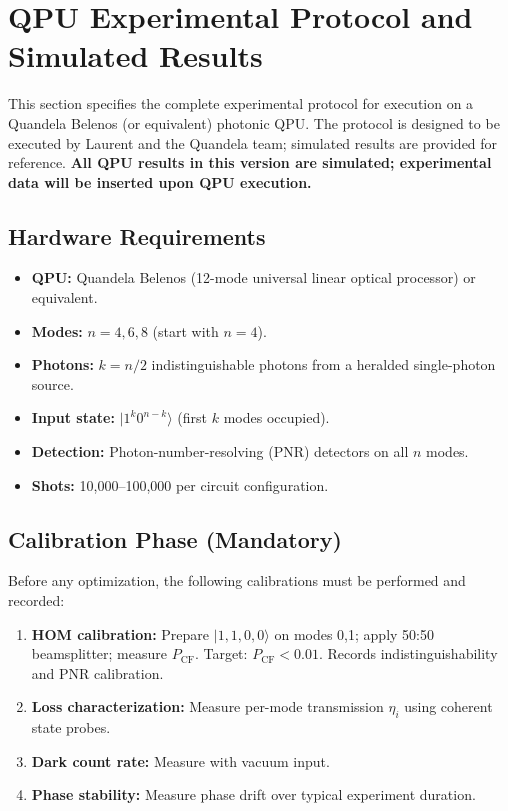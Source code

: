 \section{QPU Experimental Protocol and Simulated Results}
\label{sec:qpu}

This section specifies the complete experimental protocol for execution on a Quandela Belenos (or equivalent) photonic QPU. The protocol is designed to be executed by Laurent and the Quandela team; simulated results are provided for reference. \textbf{All QPU results in this version are simulated; experimental data will be inserted upon QPU execution.}

\subsection{Hardware Requirements}

\begin{itemize}
\item \textbf{QPU:} Quandela Belenos (12-mode universal linear optical processor) or equivalent.
\item \textbf{Modes:} $n=4,6,8$ (start with $n=4$).
\item \textbf{Photons:} $k=n/2$ indistinguishable photons from a heralded single-photon source.
\item \textbf{Input state:} $|1^k 0^{n-k}\rangle$ (first $k$ modes occupied).
\item \textbf{Detection:} Photon-number-resolving (PNR) detectors on all $n$ modes.
\item \textbf{Shots:} 10,000--100,000 per circuit configuration.
\end{itemize}

\subsection{Calibration Phase (Mandatory)}

Before any optimization, the following calibrations must be performed and recorded:

\begin{enumerate}
\item \textbf{HOM calibration:} Prepare $|1,1,0,0\rangle$ on modes 0,1; apply 50:50 beamsplitter; measure $P_{\mathrm{CF}}$. Target: $P_{\mathrm{CF}} < 0.01$. Records indistinguishability and PNR calibration.
\item \textbf{Loss characterization:} Measure per-mode transmission $\eta_i$ using coherent state probes.
\item \textbf{Dark count rate:} Measure with vacuum input.
\item \textbf{Phase stability:} Measure phase drift over typical experiment duration.
\end{enumerate}


